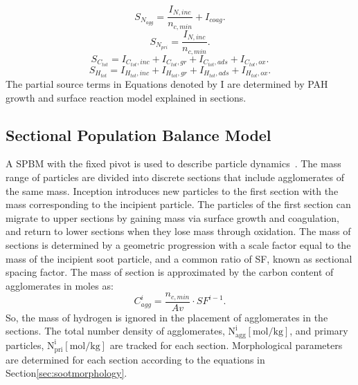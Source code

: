 \begin{equation}
	S_{N_{agg}} = \frac{I_{N,inc}}{n_{c,min}}+I_{coag}
	\label{eqn:S_N_agg}.
\end{equation}
\begin{equation}
	S_{N_{pri}} = \frac{I_{N,inc}}{n_{c,min}}
	\label{eqn:S_N_pri}.
\end{equation}
\begin{equation}
	S_{C_{tot}} = I_{C_{tot},inc}+I_{C_{tot},gr}+I_{C_{tot},ads}+I_{C_{tot},ox}
	\label{eqn:S_C_tot}.
\end{equation}
\begin{equation}
	S_{H_{tot}} = I_{H_{tot},inc}+I_{H_{tot},gr}+I_{H_{tot},ads}+I_{H_{tot},ox}
	\label{eqn:S_H_tot}.
\end{equation}
The partial source terms in Equations denoted by $\mathrm{I}$ are determined by PAH growth and surface reaction model explained in sections.

\subsection{Sectional Population Balance Model}
A SPBM with the fixed pivot is used to describe particle dynamics~\citep{wu1988discrete}. The mass range of particles are divided into discrete sections that include agglomerates of the same mass. Inception introduces new particles to the first section with the mass corresponding to the incipient particle. The particles of the first section can migrate to upper sections by gaining mass via surface growth and coagulation, and return to lower sections when they lose mass through oxidation. The mass of sections is determined by a geometric progression with a scale factor equal to the mass of the incipient soot particle, and a common ratio of SF, known as sectional spacing factor. The mass of section is approximated by the carbon content of agglomerates in moles as:
\begin{equation}
	C^i_{agg} = \frac{n_{c,min}}{Av}\cdot SF^{i-1}
	\label{eqn:Caggsec}.
\end{equation}
So, the mass of hydrogen is ignored in the placement of agglomerates in the sections.
The total number density of agglomerates, $\mathrm{N^i_{agg} [mol/kg]}$, and primary particles, $\mathrm{N^i_{pri} [mol/kg]}$ are tracked for each section. Morphological parameters are determined for each section according to the equations in Section\ref{sec:sootmorphology}.

